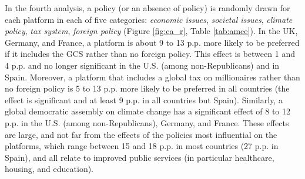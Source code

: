 \begin{bibunit}
In the fourth analysis, a policy (or an absence of policy) is randomly drawn for each platform in each of five categories: \textit{economic issues}, \textit{societal issues}, \textit{climate policy}, \textit{tax system}, \textit{foreign policy} (Figure \ref{fig:ca_r}, Table \ref{tab:amce}). 
In the UK, Germany, and France, a platform is about 9 to 13 p.p. more likely to be preferred if it includes the GCS rather than no foreign policy. %
This effect is between 1 and 4 p.p. and no longer significant in the U.S. (among non-Republicans) and in Spain. Moreover, a platform that includes a global tax on millionaires rather than no foreign policy is 5 to 13 p.p. more likely to be preferred in all countries (the effect is significant and at least 9 p.p. in all countries but Spain). 
Similarly, a global democratic assembly on climate change has a significant effect of 8 to 12 p.p. in the U.S. (among non-Republicans), Germany, and France. 
These effects are large, and not far from the effects of the policies most influential on the platforms, which range between 15 and 18 p.p. in most countries (27 p.p. in Spain), and all relate to improved public services (in particular healthcare, housing, and education).
 

\end{bibunit}
